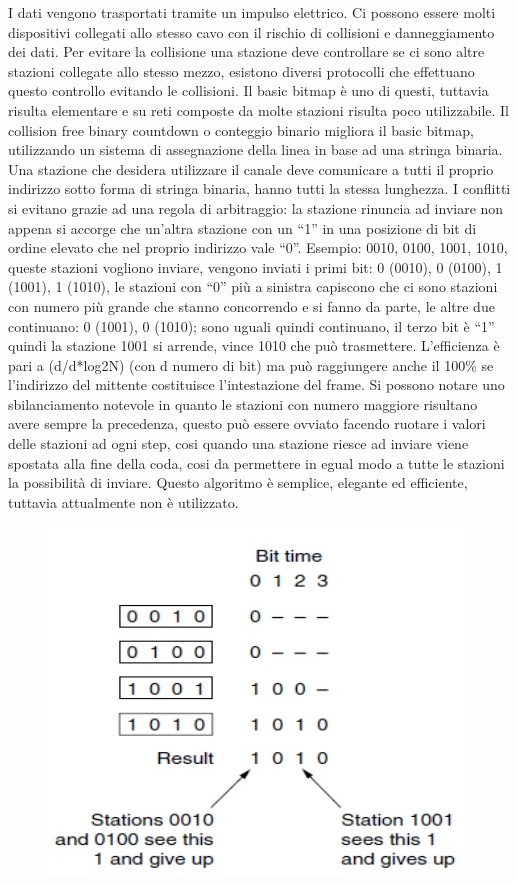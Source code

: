 I dati vengono trasportati tramite un impulso elettrico. Ci possono essere molti dispositivi collegati allo stesso cavo con il rischio di collisioni e danneggiamento dei dati.
Per evitare la collisione una stazione deve controllare se ci sono altre stazioni collegate allo stesso mezzo, esistono diversi protocolli che effettuano questo controllo evitando le collisioni.
Il basic bitmap è uno di questi, tuttavia risulta elementare e su reti composte da molte stazioni risulta poco utilizzabile.
Il collision free binary countdown o conteggio binario migliora il basic bitmap, utilizzando un sistema di assegnazione della linea in base ad una stringa binaria.
Una stazione che desidera utilizzare il canale deve comunicare a tutti il proprio indirizzo sotto forma di stringa binaria, hanno tutti la stessa lunghezza.
I conflitti si evitano grazie ad una regola di arbitraggio: la stazione rinuncia ad inviare non appena si accorge che un’altra stazione con un “1” in una posizione di bit di ordine elevato che nel proprio indirizzo vale “0”.
Esempio: 0010, 0100, 1001, 1010, queste stazioni vogliono inviare, vengono inviati i primi bit: 0 (0010), 0 (0100), 1 (1001), 1 (1010), le stazioni con “0” più a sinistra capiscono che ci sono stazioni con numero più grande che stanno concorrendo e si fanno da parte, le altre due continuano: 0 (1001), 0 (1010); sono uguali quindi continuano, il terzo bit è “1” quindi la stazione 1001 si arrende, vince 1010 che può trasmettere.
L’efficienza è pari a (d/d*log2N) (con d numero di bit) ma può raggiungere anche il 100\% se l’indirizzo del mittente costituisce l’intestazione del frame.
Si possono notare uno sbilanciamento notevole in quanto le stazioni con numero maggiore risultano avere sempre la precedenza, questo può essere ovviato facendo ruotare i valori delle stazioni ad ogni step, cosi quando una stazione riesce ad inviare viene spostata alla fine della coda, cosi da permettere in egual modo a tutte le stazioni la possibilità di inviare.
Questo algoritmo è semplice, elegante ed efficiente, tuttavia attualmente non è utilizzato.

\begin{figure}[H]
\centering
\includegraphics[scale=0.6]{res/img/25_FreeBinaryCountdown.png}
\end{figure} 


